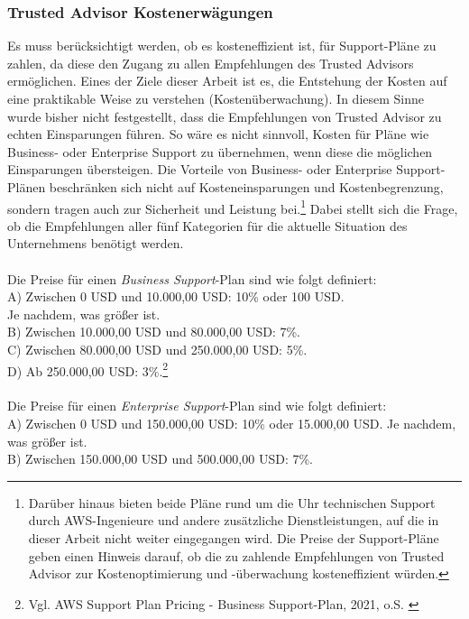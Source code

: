 \subsubsection*{Trusted Advisor Kostenerwägungen}
Es muss berücksichtigt werden, ob es kosteneffizient ist, für Support-Pläne zu zahlen, da diese den Zugang zu allen Empfehlungen des Trusted Advisors ermöglichen. Eines der Ziele dieser Arbeit ist es, die Entstehung der Kosten auf eine praktikable Weise zu verstehen (Kostenüberwachung). In diesem Sinne wurde bisher nicht festgestellt, dass die Empfehlungen von Trusted Advisor zu echten Einsparungen führen. %
So wäre es nicht sinnvoll, Kosten für Pläne wie Business- oder Enterprise Support zu übernehmen, wenn diese die möglichen Einsparungen übersteigen. Die Vorteile von Business- oder Enterprise Support-Plänen beschränken sich nicht auf Kosteneinsparungen und Kostenbegrenzung, sondern tragen auch zur Sicherheit und Leistung bei.\footnote{Darüber hinaus bieten beide Pläne rund um die Uhr technischen Support durch AWS-Ingenieure und andere zusätzliche Dienstleistungen, auf die in dieser Arbeit nicht weiter eingegangen wird. Die Preise der Support-Pläne geben einen Hinweis darauf, ob die zu zahlende Empfehlungen von Trusted Advisor zur Kostenoptimierung und -überwachung kosteneffizient würden.} Dabei stellt sich die Frage, ob die Empfehlungen aller fünf Kategorien für die aktuelle Situation des Unternehmens benötigt werden.
\\\\   
Die Preise für einen \textit{Business Support}-Plan sind wie folgt definiert: 
\\
A) Zwischen 0 USD und 10.000,00 USD: 10\% oder 100 USD. \\
Je nachdem, was größer ist.\\
B) Zwischen 10.000,00 USD und 80.000,00 USD: 7\%.\\
C) Zwischen 80.000,00 USD und 250.000,00 USD: 5\%.\\
D) Ab 250.000,00 USD: 3\%.\footnote{Vgl.  AWS Support Plan Pricing - Business Support-Plan, 2021, o.S. \cite{AMZ38}}
\\\\
Die Preise für einen \textit{Enterprise Support}-Plan sind wie folgt definiert:
\\
A) Zwischen 0 USD und 150.000,00 USD: 10\% oder 15.000,00 USD. Je nachdem, was größer ist.\\
B) Zwischen 150.000,00 USD und 500.000,00 USD: 7\%.\\

